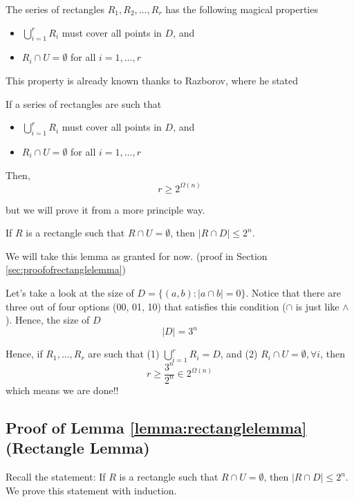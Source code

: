 \begin{proposition}
	The series of rectangles $R_1, R_2, \dots, R_r$ has the following magical properties
	\begin{itemize}
		\item $\bigcup_{i = 1}^r R_i$ must cover all points in $D$, and 
		\item $R_i \cap U = \emptyset$ for all $i = 1, \dots, r$
	\end{itemize}
\end{proposition}

This property is already known thanks to Razborov, where he stated
\begin{theorem}
	If a series of rectangles are such that 
	\begin{itemize}
		\item $\bigcup_{i = 1}^r R_i$ must cover all points in $D$, and 
		\item $R_i \cap U = \emptyset$ for all $i = 1, \dots, r$
	\end{itemize}
	Then, 
	\begin{equation}
		r \geq 2^{\Omega(n)}
	\end{equation}
\end{theorem}
but we will prove it from a more principle way. 

\begin{lemma}
	\label{lemma:rectanglelemma}
	If $R$ is a rectangle such that $R\cap U = \emptyset$, then $|R \cap D| \leq 2^n$. 
\end{lemma}
We will take this lemma as granted for now. (proof in Section \ref{sec:proofofrectanglelemma})

Let's take a look at the size of $D = \{ (a, b) : |a \cap b| = 0 \}$. Notice that there are three out of four options (00, 01, 10) that satisfies this condition ($\cap$ is just like $\land$). Hence, the size of $D$
\begin{equation}
	|D| = 3^n
\end{equation}

Hence, if $R_1, \dots, R_r$ are such that (1) $\bigcup_{i = 1}^r R_i = D$, and (2) $R_i \cap U = \emptyset, \forall i$, then 
\begin{equation}
	r \geq  \frac{3^n}{2^n} \in 2^{\Omega (n)}
\end{equation}
which means we are done!!

\subsection{Proof of Lemma \ref{lemma:rectanglelemma} (Rectangle Lemma)\label{sec:proofofrectanglelemma}}
Recall the statement: If $R$ is a rectangle such that $R\cap U = \emptyset$, then $|R \cap D| \leq 2^n$. We prove this statement with induction. 

